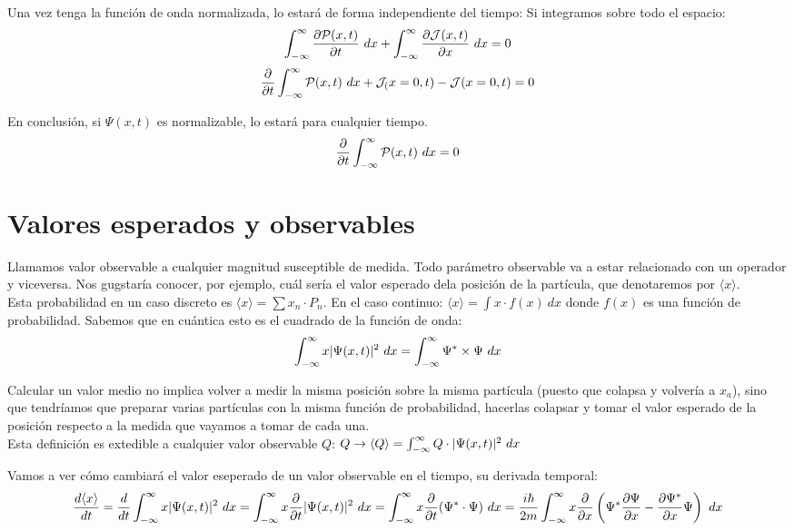 \documentclass{report}
\begin{document}
    \noindent Una vez tenga la función de onda normalizada, lo estará de forma independiente del tiempo:
    Si integramos sobre todo el espacio: 
    \[\int_{-\infty}^{\infty}\dfrac{\partial\mcP(x,t)}{\partial t}\ dx+\int_{-\infty}^{\infty}\dfrac{\partial\mcJ(x,t)}{\partial x}\ dx=0\]
    \[\dfrac{\partial}{\partial t}\int_{-\infty}^{\infty}\mcP(x,t)\ dx+\mcJ_(x=0,t)-\mcJ(x=0,t)=0\] 

    \noindent En conclusión, si $\Psi(x,t)$ es normalizable, lo estará para cualquier tiempo.
    \begin{equation}
      \dfrac{\partial}{\partial t}\int_{-\infty}^{\infty}\mathcal{P}(x,t)\ dx=0
    \end{equation}
  \section{Valores esperados y observables}
    \noindent Llamamos valor observable a cualquier magnitud susceptible de medida.
    Todo parámetro observable va a estar relacionado con un operador y viceversa. Nos gugstaría conocer,
    por ejemplo, cuál sería el valor esperado dela posición de la partícula, que denotaremos por $\langle x\rangle$.\\

    \noindent Esta probabilidad en un caso discreto es $\langle x\rangle=\sum x_n\cdot P_n$.
    En el caso continuo: $\langle x\rangle=\int x\cdot f(x)\ dx$ donde $f(x)$ es una función de probabilidad.
    Sabemos que en cuántica esto es el cuadrado de la función de onda:
    \begin{equation}
      \int_{-\infty}^{\infty}x\abs{\Psi(x,t)}^2\ dx=\int_{-\infty}^{\infty}\Psi^*\times\Psi\ dx
    \end{equation}

    \noindent Calcular un valor medio no implica volver a medir la misma posición sobre la misma partícula 
    (puesto que colapsa y volvería a $x_a$), sino que tendríamos que preparar 
    varias partículas con la misma función de probabilidad, hacerlas colapsar y tomar el valor 
    esperado de la posición respecto a la medida que vayamos a tomar de cada una.\\

    \noindent Esta definición es extedible a cualquier valor observable $Q$: $Q\rightarrow\langle Q\rangle=
    \int_{-\infty}^{\infty}Q\cdot\lvert\Psi(x,t)\rvert^2\ dx$

    \noindent Vamos a ver cómo cambiará el valor eseperado de un valor observable en el tiempo, su derivada temporal:
    \[\dfrac{d\langle x\rangle}{dt}=\dfrac{d}{dt}\int_{-\infty}^{\infty}x\abs{\Psi(x,t)}^2\ dx=
    \int_{-\infty}^{\infty}x\dfrac{\partial}{\partial t}\abs{\Psi(x,t)}^2\ dx=\int_{-\infty}^{\infty}
    x\dfrac{\partial}{\partial t}(\Psi^*\cdot\Psi)\ dx=\dfrac{i\hbar}{2m}\int_{-\infty}^{\infty}
    x\dfrac{\partial}{\partial x}\left(\Psi^*\dfrac{\partial\Psi}{\partial x}-\dfrac{\partial\Psi^*}{\partial x}\Psi\right)\ dx\]
\end{document}
